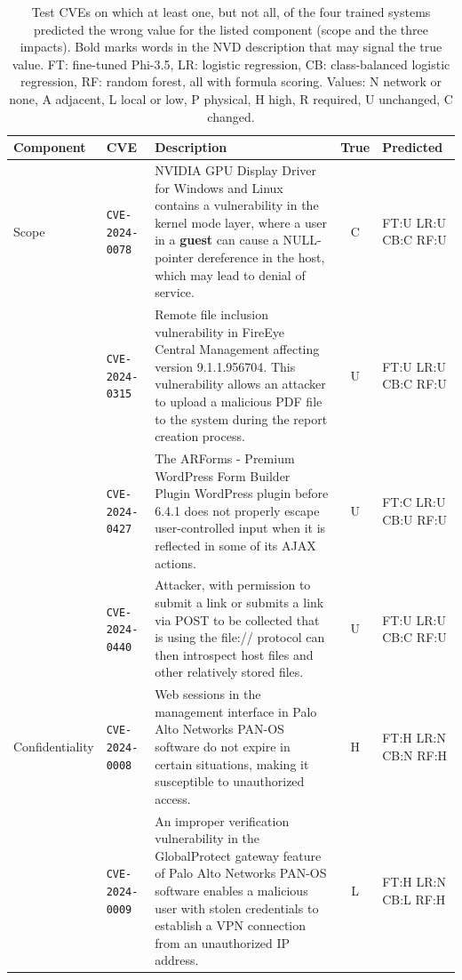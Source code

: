 \begin{table}[p]
\centering
\caption{Test CVEs on which at least one, but not all, of the four trained systems predicted the wrong value for the listed component (scope and the three impacts). Bold marks words in the NVD description that may signal the true value. FT: fine-tuned Phi-3.5, LR: logistic regression, CB: class-balanced logistic regression, RF: random forest, all with formula scoring. Values: N network or none, A adjacent, L local or low, P physical, H high, R required, U unchanged, C changed.}
\label{tab:qualsomeb}
\scriptsize
\setlength{\tabcolsep}{3pt}
\begin{tabular}{@{}llp{6.2cm}cl@{}}
\toprule
Component & CVE & Description & True & Predicted \\
\midrule
Scope & \texttt{CVE-2024-0078} & NVIDIA GPU Display Driver for Windows and Linux contains a vulnerability in the kernel mode layer, where a user in a \textbf{guest} can cause a NULL-pointer dereference in the host, which may lead to denial of service. & C & FT:U LR:U CB:C RF:U \\
 & \texttt{CVE-2024-0315} & Remote file inclusion vulnerability in FireEye Central Management affecting version 9.1.1.956704. This vulnerability allows an attacker to upload a malicious PDF file to the system during the report creation process. & U & FT:U LR:U CB:C RF:U \\
 & \texttt{CVE-2024-0427} & The ARForms - Premium WordPress Form Builder Plugin WordPress plugin before 6.4.1 does not properly escape user-controlled input when it is reflected in some of its AJAX actions. & U & FT:C LR:U CB:U RF:U \\
 & \texttt{CVE-2024-0440} & Attacker, with permission to submit a link or submits a link via POST to be collected that is using the file:// protocol can then introspect host files and other relatively stored files. & U & FT:U LR:U CB:C RF:U \\
\addlinespace[3pt]
Confidentiality & \texttt{CVE-2024-0008} & Web sessions in the management interface in Palo Alto Networks PAN-OS software do not expire in certain situations, making it susceptible to unauthorized access. & H & FT:H LR:N CB:N RF:H \\
 & \texttt{CVE-2024-0009} & An improper verification vulnerability in the GlobalProtect gateway feature of Palo Alto Networks PAN-OS software enables a malicious user with stolen credentials to establish a VPN connection from an unauthorized IP address. & L & FT:H LR:N CB:L RF:H \\

\end{tabular}
\end{table}
